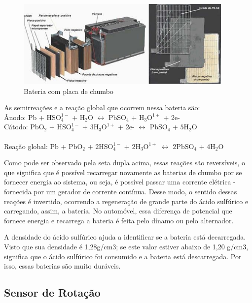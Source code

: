 \begin{figure}[h]
  \centering
  \includegraphics[width=400px, scale=1]{figuras/bateria}
  \caption{Bateria com placa de chumbo}
\end{figure}

As semirreações e a reação global que ocorrem nessa bateria são:\\
Ânodo: $\mathrm{Pb}$ + $\mathrm{HSO_4^{1-}}$ + $\mathrm{H_2 O}$ $\leftrightarrow$
 $\mathrm{PbSO_4}$ + $\mathrm{H_3 O^{1+}}$ + 2e-\\

Cátodo: $\mathrm{Pb O_2}$ + $\mathrm{HSO_4^{1-}}$ + $\mathrm{3 H_3 O^{1+}}$ +
2e- $\leftrightarrow$ $\mathrm{PbSO_4}$ + $\mathrm{5 H_2 O}$\\

\dotfill\\
Reação global: $\mathrm{Pb}$ + $\mathrm{PbO_2}$ + $\mathrm{2HSO_4^{1-}}$ +
$\mathrm{2H_3 O^{1+}}$ $\leftrightarrow$ $\mathrm{2PbSO_4}$ + $\mathrm{4 H_2 O}$

Como pode ser observado pela seta dupla acima, essas reações são reversíveis, o
que significa que é possível recarregar novamente as baterias de chumbo por se
fornecer energia ao sistema, ou seja, é possível passar uma corrente elétrica
-fornecida por um gerador de corrente contínua. Desse modo, o sentido dessas
reações é invertido, ocorrendo a regeneração de grande parte do ácido sulfúrico
e carregando, assim, a bateria. No automóvel, essa diferença de potencial que
fornece energia e recarrega a bateria é feita pelo dínamo ou pelo alternador.

A densidade do ácido sulfúrico ajuda a identificar se a bateria está decarregada.
Visto que sua densidade é 1,28g/cm3; se este valor estiver abaixo de 1,20 g/cm3,
significa que o ácido sulfúrico foi consumido e a bateria está descarregada.
Por isso, essas baterias são muito duráveis.

\subsection{Sensor de Rotação}

